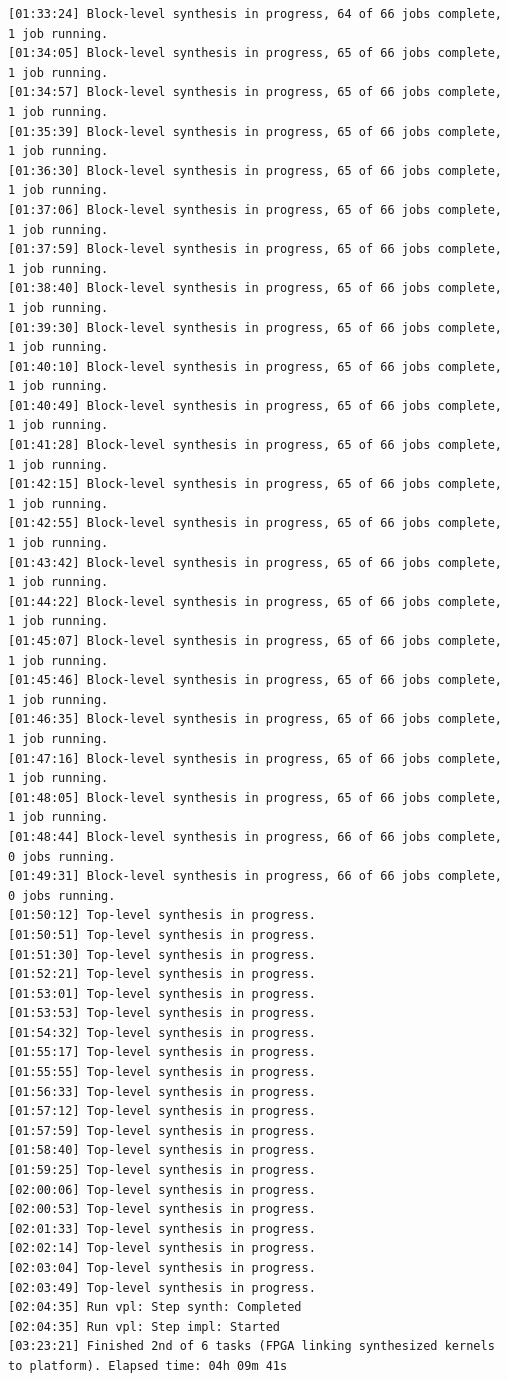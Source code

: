 \begin{lstlisting}
[01:33:24] Block-level synthesis in progress, 64 of 66 jobs complete, 1 job running.
[01:34:05] Block-level synthesis in progress, 65 of 66 jobs complete, 1 job running.
[01:34:57] Block-level synthesis in progress, 65 of 66 jobs complete, 1 job running.
[01:35:39] Block-level synthesis in progress, 65 of 66 jobs complete, 1 job running.
[01:36:30] Block-level synthesis in progress, 65 of 66 jobs complete, 1 job running.
[01:37:06] Block-level synthesis in progress, 65 of 66 jobs complete, 1 job running.
[01:37:59] Block-level synthesis in progress, 65 of 66 jobs complete, 1 job running.
[01:38:40] Block-level synthesis in progress, 65 of 66 jobs complete, 1 job running.
[01:39:30] Block-level synthesis in progress, 65 of 66 jobs complete, 1 job running.
[01:40:10] Block-level synthesis in progress, 65 of 66 jobs complete, 1 job running.
[01:40:49] Block-level synthesis in progress, 65 of 66 jobs complete, 1 job running.
[01:41:28] Block-level synthesis in progress, 65 of 66 jobs complete, 1 job running.
[01:42:15] Block-level synthesis in progress, 65 of 66 jobs complete, 1 job running.
[01:42:55] Block-level synthesis in progress, 65 of 66 jobs complete, 1 job running.
[01:43:42] Block-level synthesis in progress, 65 of 66 jobs complete, 1 job running.
[01:44:22] Block-level synthesis in progress, 65 of 66 jobs complete, 1 job running.
[01:45:07] Block-level synthesis in progress, 65 of 66 jobs complete, 1 job running.
[01:45:46] Block-level synthesis in progress, 65 of 66 jobs complete, 1 job running.
[01:46:35] Block-level synthesis in progress, 65 of 66 jobs complete, 1 job running.
[01:47:16] Block-level synthesis in progress, 65 of 66 jobs complete, 1 job running.
[01:48:05] Block-level synthesis in progress, 65 of 66 jobs complete, 1 job running.
[01:48:44] Block-level synthesis in progress, 66 of 66 jobs complete, 0 jobs running.
[01:49:31] Block-level synthesis in progress, 66 of 66 jobs complete, 0 jobs running.
[01:50:12] Top-level synthesis in progress.
[01:50:51] Top-level synthesis in progress.
[01:51:30] Top-level synthesis in progress.
[01:52:21] Top-level synthesis in progress.
[01:53:01] Top-level synthesis in progress.
[01:53:53] Top-level synthesis in progress.
[01:54:32] Top-level synthesis in progress.
[01:55:17] Top-level synthesis in progress.
[01:55:55] Top-level synthesis in progress.
[01:56:33] Top-level synthesis in progress.
[01:57:12] Top-level synthesis in progress.
[01:57:59] Top-level synthesis in progress.
[01:58:40] Top-level synthesis in progress.
[01:59:25] Top-level synthesis in progress.
[02:00:06] Top-level synthesis in progress.
[02:00:53] Top-level synthesis in progress.
[02:01:33] Top-level synthesis in progress.
[02:02:14] Top-level synthesis in progress.
[02:03:04] Top-level synthesis in progress.
[02:03:49] Top-level synthesis in progress.
[02:04:35] Run vpl: Step synth: Completed
[02:04:35] Run vpl: Step impl: Started
[03:23:21] Finished 2nd of 6 tasks (FPGA linking synthesized kernels to platform). Elapsed time: 04h 09m 41s 


\end{lstlisting}
